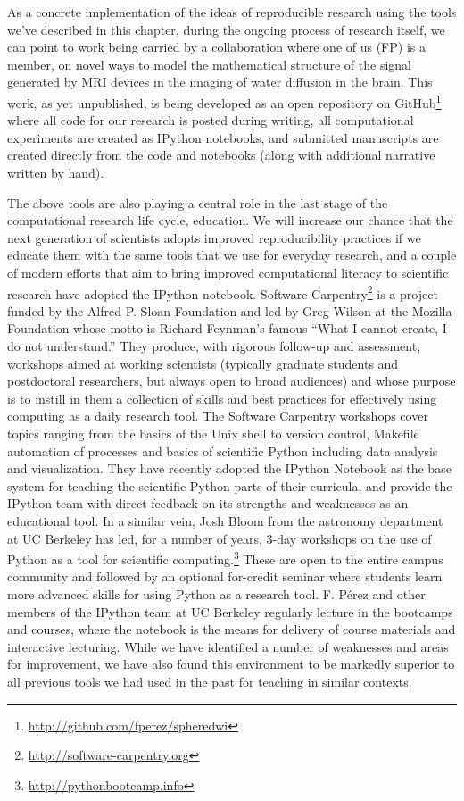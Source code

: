 \documentclass[ChapterTOCs,krantz2]{krantz} %
\begin{document}
As a concrete implementation of the ideas of reproducible research using the
tools we've described in this chapter, during the ongoing process of research
itself, we can point to work being carried by a collaboration where one of us
(FP) is a member, on novel ways to model the mathematical structure of the
signal generated by MRI devices in the imaging of water diffusion in the
brain.  This work, as yet unpublished, is being developed as an open repository
on GitHub\footnote{\url{http://github.com/fperez/spheredwi}} where all code
for our research is posted during writing, all computational experiments are
created as IPython notebooks, and submitted manuscripts are created directly
from the code and notebooks (along with additional narrative written by hand).

The above tools are also playing a central role in the last stage of the
computational research life cycle, education.  We will increase our chance that
the next generation of scientists adopts improved reproducibility practices if
we educate them with the same tools that we use for everyday research, and a
couple of modern efforts that aim to bring improved computational literacy to
scientific research have adopted the IPython notebook.  Software
Carpentry\footnote{\url{http://software-carpentry.org}} is a project funded by
the Alfred P. Sloan Foundation and led by Greg Wilson at the Mozilla Foundation
whose motto is Richard Feynman's famous ``What I cannot create, I do not
understand.''  They produce, with rigorous follow-up and assessment, workshops
aimed at working scientists (typically graduate students and postdoctoral
researchers, but always open to broad audiences) and whose purpose is to
instill in them a collection of skills and best practices for effectively using
computing as a daily research tool.  The Software Carpentry workshops cover
topics ranging from the basics of the Unix shell to version control, Makefile
automation of processes and basics of scientific Python including data analysis
and visualization.  They have recently adopted the IPython Notebook as the base
system for teaching the scientific Python parts of their curricula, and provide
the IPython team with direct feedback on its strengths and weaknesses as an
educational tool.  In a similar vein, Josh Bloom from the astronomy department
at UC Berkeley has led, for a number of years, 3-day workshops on the use of
Python as a tool for scientific
computing.\footnote{\url{http://pythonbootcamp.info}}  These are open to the
entire campus community and followed by an optional for-credit seminar where
students learn more advanced skills for using Python as a research tool.  F.
Pérez and other members of the IPython team at UC Berkeley regularly lecture in
the bootcamps and courses, where the notebook is the means for delivery of
course materials and interactive lecturing.  While we have identified a number
of weaknesses and areas for improvement, we have also found this environment to
be markedly superior to all previous tools we had used in the past for teaching
in similar contexts.
\end{document}
